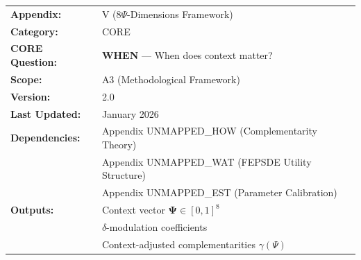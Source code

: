 %
%
%


\begin{tcolorbox}[colback=green!5!white, colframe=green!75!black, 
    title=\textbf{CORE Appendix: Context Assessment}]

\begin{tabular}{@{}ll@{}}
\textbf{Appendix:} & V (8$\Psi$-Dimensions Framework) \\
\textbf{Category:} & CORE \\
\textbf{CORE Question:} & \textbf{WHEN} --- When does context matter? \\
\textbf{Scope:} & A3 (Methodological Framework) \\
\textbf{Version:} & 2.0 \\
\textbf{Last Updated:} & January 2026 \\
\textbf{Dependencies:} & Appendix UNMAPPED_HOW (Complementarity Theory) \\
 & Appendix UNMAPPED_WAT (FEPSDE Utility Structure) \\
 & Appendix UNMAPPED_EST (Parameter Calibration) \\
\textbf{Outputs:} & Context vector $\boldsymbol{\Psi} \in [0,1]^8$ \\
 & $\delta$-modulation coefficients \\
 & Context-adjusted complementarities $\gamma(\Psi)$ \\
\end{tabular}

\end{tcolorbox}


